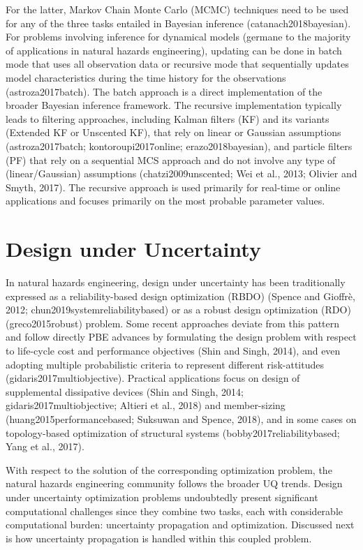 For the latter, Markov Chain Monte Carlo (MCMC) techniques need to be used for any of the three tasks entailed in Bayesian inference (catanach2018bayesian). For problems involving inference for dynamical models (germane to the majority of applications in natural hazards engineering), updating can be done in batch mode that uses all observation data or recursive mode that sequentially updates model characteristics during the time history for the observations (astroza2017batch). The batch approach is a direct implementation of the broader Bayesian inference framework. The recursive implementation typically leads to filtering approaches, including Kalman filters (KF) and its variants (Extended KF or Unscented KF), that rely on linear or Gaussian assumptions (astroza2017batch; kontoroupi2017online; erazo2018bayesian), and particle filters (PF) that rely on a sequential MCS approach and do not involve any type of (linear/Gaussian) assumptions (chatzi2009unscented; Wei et al., 2013; Olivier and Smyth, 2017). The recursive approach is used primarily for real-time or online applications and focuses primarily on the most probable parameter values. 

\section{Design under Uncertainty}
\label{sec:uq_design}

In natural hazards engineering, design under uncertainty has been traditionally expressed as a reliability-based design optimization (RBDO) (Spence and Gioffrè, 2012; chun2019systemreliabilitybased) or as a robust design optimization (RDO) (greco2015robust) problem. Some recent approaches deviate from this pattern and follow directly PBE advances by formulating the design problem with respect to life-cycle cost and performance objectives (Shin and Singh, 2014), and even adopting multiple probabilistic criteria to represent different risk-attitudes (gidaris2017multiobjective). Practical applications focus on design of supplemental dissipative devices (Shin and Singh, 2014; gidaris2017multiobjective; Altieri et al., 2018) and member-sizing (huang2015performancebased; Suksuwan and Spence, 2018), and in some cases on topology-based optimization of structural systems (bobby2017reliabilitybased; Yang et al., 2017).

With respect to the solution of the corresponding optimization problem, the natural hazards engineering community follows the broader UQ trends. Design under uncertainty optimization problems undoubtedly present significant computational challenges since they combine two tasks, each with considerable computational burden: uncertainty propagation and optimization. Discussed next is how uncertainty propagation is handled within this coupled problem.

